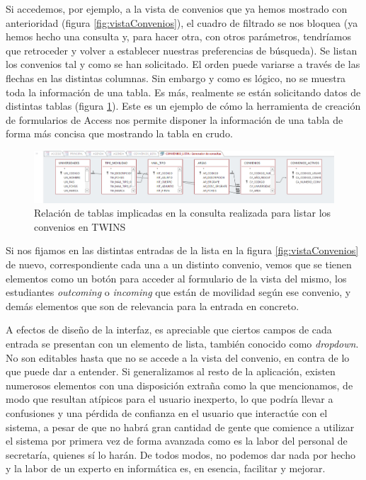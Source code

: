 Si accedemos, por ejemplo, a la vista de convenios que ya hemos mostrado con anterioridad (figura \ref{fig:vistaConvenios}), el cuadro de filtrado se nos bloquea (ya hemos hecho una consulta y, para hacer otra, con otros parámetros, tendríamos que retroceder y volver a establecer nuestras preferencias de búsqueda). Se listan los convenios tal y como se han solicitado. El orden puede variarse a través de las flechas en las distintas columnas. Sin embargo y como es lógico, no se muestra toda la información de una tabla. Es más, realmente se están solicitando datos de distintas tablas (figura \ref{fig:tablasConsultaConvenios}). Este es un ejemplo de cómo la herramienta de creación de formularios de Access nos permite disponer la información de una tabla de forma más concisa que mostrando la tabla en crudo.

\begin{figure}
	\centering
	\includegraphics[width=\textwidth]{img/Capturas de TWINS/relacionTablasConsultaConveniosLista.png}
	\caption[Tablas implicadas en consultar convenios en TWINS]{Relación de tablas implicadas en la consulta realizada para listar los convenios en TWINS}
	\label{fig:tablasConsultaConvenios}
\end{figure}

Si nos fijamos en las distintas entradas de la lista en la figura \ref{fig:vistaConvenios} de nuevo, correspondiente cada una a un distinto convenio, vemos que se tienen elementos como un botón para acceder al formulario de la vista del mismo, los estudiantes \textit{outcoming} o \textit{incoming} que están de movilidad según ese convenio, y demás elementos que son de relevancia para la entrada en concreto.

A efectos de diseño de la interfaz, es apreciable que ciertos campos de cada entrada se presentan con un elemento de lista, también conocido como \textit{dropdown}. No son editables hasta que no se accede a la vista del convenio, en contra de lo que puede dar a entender. Si generalizamos al resto de la aplicación, existen numerosos elementos con una disposición extraña como la que mencionamos, de modo que resultan atípicos para el usuario inexperto, lo que podría llevar a confusiones y una pérdida de confianza en el usuario que interactúe con el sistema, a pesar de que no habrá gran cantidad de gente que comience a utilizar el sistema por primera vez de forma avanzada como es la labor del personal de secretaría, quienes sí lo harán. De todos modos, no podemos dar nada por hecho y la labor de un experto en informática es, en esencia, facilitar y mejorar.

